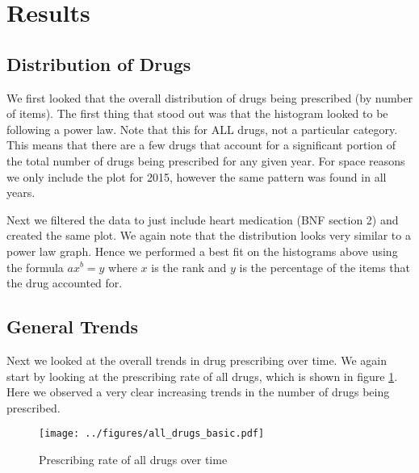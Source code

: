 \documentclass[a4paper]{article}
\begin{document}


\section{Results}
	\subsection{Distribution of Drugs}
		We first looked that the overall distribution of drugs being prescribed (by number of items). 
		The first thing that stood out was that the histogram looked to be following a power law. Note 
		that this for ALL drugs, not a particular category. This means that there are a few drugs that 
		account for a significant portion of the total number of drugs being prescribed for any given 
		year. For space reasons we only include the plot for 2015, however the same pattern was found in 
		all years. 


		Next we filtered the data to just include heart medication (BNF section 2) and created the same
		plot. We again note that the distribution looks very similar to a power law graph. Hence we performed 
		a best fit on the histograms above using the formula $ax^{b} = y$ where $x$ is the rank and $y$ is 
		the percentage of the items that the drug accounted for.





	\subsection{General Trends}
		Next we looked at the overall trends in drug prescribing over time. We again 
		start by looking at the prescribing rate of all drugs, which is shown in figure \ref{all_drugs_basic}.
		Here we observed a very clear increasing trends in the number of drugs being prescribed.



\begin{figure}[H]
	\centering
	\texttt{[image: ../figures/all\_drugs\_basic.pdf]}  
	\caption{Prescribing rate of all drugs over time}
	\label{all_drugs_basic}
\end{figure}
		
\end{document}
